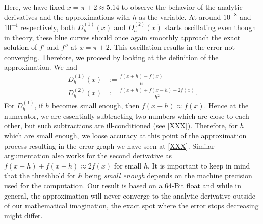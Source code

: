 Here, we have fixed \(x = \pi + 2 \approx 5.14\) to observe the behavior of the analytic derivatives and the approximations with \(h\) as the variable. At around \(10^{-8}\) and \(10^{-4}\) respectively, both \(D^{(1)}_h(x)\) and \(D^{(2)}_h(x)\) starts oscillating even though in theory, these blue curves should once again smoothly approach the exact solution of \(f'\) and \(f''\) at \(x = \pi + 2\). This oscillation results in the error not converging. Therefore, we proceed by looking at the definition of the approximation. We had
\begin{align*}
    D^{(1)}_h(x) &:= \frac{f(x + h) - f(x)}{h} \\
    D^{(2)}_h(x) &:= \frac{f(x + h) + f(x - h)- 2 f(x)}{h^2} \text{.}
\end{align*}
For \(D^{(1)}_h\), if \(h\) becomes small enough, then \(f(x + h) \approx f(x)\). Hence at the numerator, we are essentially subtracting two numbers which are close to each other, but such subtractions are ill-conditioned (see \ref{XXX}). Therefore, for \(h\) which are small enough, we loose accuracy at this point of the approximation process resulting in the error graph we have seen at \ref{XXX}. Similar argumentation also works for the second derivative as \(f(x + h) + f(x - h) \approx 2 f(x)\) for small \(h\). It is important to keep in mind that the threshhold for \(h\) being \textit{small enough} depends on the machine precision used for the computation. Our result is based on a 64-Bit float and while in general, the approximation will never converge to the analytic derivative outside of our mathematical imagination, the exact spot where the error stops decreasing might differ.